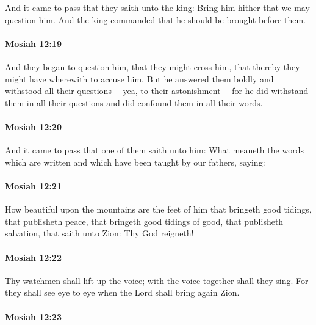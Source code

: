 			And it came to pass that they saith unto the king:
			Bring him hither that we may question him.
			And the king commanded that he should be brought before them.

		\paragraph{Mosiah 12:19} %
			\label{MOSIAH-12-19}

			And they began to question him, that they might cross him,
			that thereby they might have wherewith to accuse him.
			But he answered them boldly and withstood all their questions
			---yea, to their astonishment---
			for he did withstand them in all their questions
			and did confound them in all their words.

		\paragraph{Mosiah 12:20} %
			\label{MOSIAH-12-20}

			And it came to pass that one of them saith unto him:
			What meaneth the words which are written
			and which have been taught by our fathers, saying:

		\paragraph{Mosiah 12:21} %
			\label{MOSIAH-12-21}

			How beautiful upon the mountains are the feet of him
			that bringeth good tidings,
			that publisheth peace,
			that bringeth good tidings of good,
			that publisheth salvation,
			that saith unto Zion:
			Thy God reigneth!

		\paragraph{Mosiah 12:22} %
			\label{MOSIAH-12-22}

			Thy watchmen shall lift up the voice;
			with the voice together shall they sing.
			For they shall see eye to eye when the Lord shall bring again Zion.

		\paragraph{Mosiah 12:23} %
			\label{MOSIAH-12-23}

